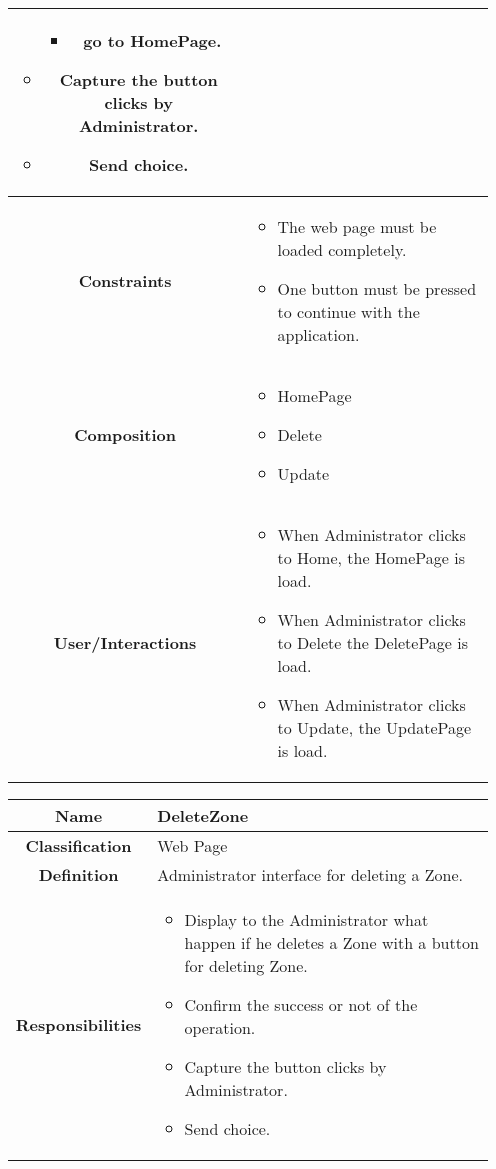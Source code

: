\documentclass[11pt, a4paper,titlepage]{article}
\begin{document}
\begin{enumerate}
\begin{tabularx}{\textwidth}{| c | X |}
\begin{itemize}
\begin{itemize}
			\item go to HomePage.
		\end{itemize}
		\item Capture the button clicks by Administrator.
		\item Send choice.
	\end{itemize}
	\\
	\hline
	\textbf{Constraints} &
	\begin{itemize}
		\item  The web page must be loaded completely.
		\item One button must be pressed to continue with the application.
	\end{itemize}
	\\
	\hline
	\textbf{Composition} &
	\begin{itemize}
		\item HomePage
		\item Delete
		\item Update
	\end{itemize}
	\\
	\hline
	\textbf{User/Interactions} &
	\begin{itemize}
		\item When Administrator clicks to Home, the HomePage is load.    	
		\item When Administrator clicks to Delete the DeletePage is load.    	
		\item When Administrator clicks to Update, the UpdatePage is load.
	\end{itemize}
	\\
	\hline 
\end{tabularx}
\begin{tabularx}{\textwidth}{| c | X |}
	\hline
	\textbf{Name} &
	DeleteZone
	\\
	\hline
	\textbf{Classification} &
	Web Page
	\\
	\hline
	\textbf{Definition} &
	Administrator interface for deleting a Zone.\\
	\hline
	\textbf{Responsibilities} &
	\begin{itemize}
		\item Display to the Administrator what happen if he deletes a Zone with a button for deleting Zone.
		\item Confirm the success or not of the operation.
		\item Capture the button clicks by Administrator.
		\item Send choice.
	\end{itemize}

\end{tabularx}
\end{enumerate}
\end{document}
